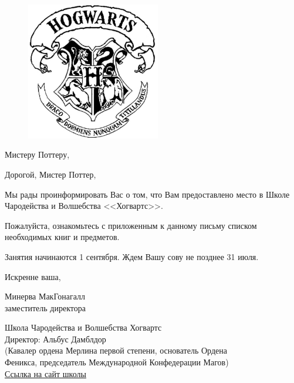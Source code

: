\documentclass[12pt, a4paper]{article}
\begin{document}
\renewcommand{\thesection}{Приложение \Asbuk{section}}

\setcounter{section}{0}
\thispagestyle{empty}

\begin{figure}[H]
\centering
\includegraphics[height=6cm]{hg1.png}
\end{figure}

\vspace{1cm}
\begin{flushleft}
{ \fontsize{12}{1}\selectfont Мистеру Поттеру,}
\end{flushleft}
\newcommand{\newsize}[1]
{{\fontsize{14}{1}\selectfont #1 }}
\vspace{2.5cm}
\newsize{Дорогой, Мистер Поттер,}\par
\noindent
\newsize{Мы рады проинформировать Вас о том, что Вам предоставлено место в Школе Чародейства и Волшебства <<Хогвартс>>.}\par
\noindent
\newsize{Пожалуйста, ознакомьтесь с приложенным к данному письму списком необходимых книг и предметов.}\par
\noindent
\newsize{Занятия начинаются 1 сентября. Ждем Вашу сову не позднее 31 июля.}\par
\noindent
\newsize{Искренне ваша,}\par
\newsize{}\par
\noindent
\newsize{Минерва МакГонагалл}\\
\noindent
\newsize{заместитель директора}
\vfill
\begin{center}
\newsize{Школа Чародейства и Волшебства Хогвартс}\\
Директор: Альбус Дамблдор\\(Кавалер ордена Мерлина первой степени, основатель Ордена\\Феникса, председатель Международной Конфедерации Магов)\\ 
 \href{http://hogwarts.ru/}{Ссылка на сайт школы}
\end{center}
\end{document}
